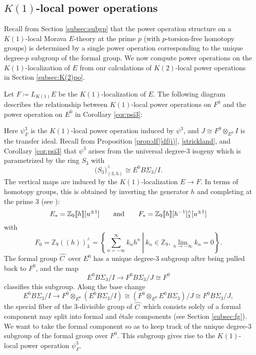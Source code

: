 \documentclass{gtpart}
\theoremstyle{definition}
\theoremstyle{remark}
\newcommand{\mb}[1]{\mathbb{#1}}
\newcommand{\BZ}{{\mb Z}}
\newcommand{\HC}{\widehat{C~}\!}
\newcommand{\ad}{{\rm and}}
\newcommand{\p}{\psi^3}
\newcommand{\ce}{\coloneqq}
\numberwithin{equation}{section}
\numberwithin{thm}{section}
\begin{document}
\subsection{$K(1)$-local power operations}
\label{subsec:K(1)po}

Recall from Section \ref{subsec:subgp} that the power operation 
structure on a $K(1)$-local Morava $E$-theory at the prime $p$ (with 
$p$-torsion-free homotopy groups) is determined by a single power 
operation corresponding to the unique degree-$p$ subgroup of the formal 
group.  We now compute power operations on the $K(1)$-localization of 
$E$ from our calculations of $K(2)$-local power operations in Section 
\ref{subsec:K(2)po}.  

Let $F \ce L_{K(1)} E$ be the $K(1)$-localization of $E$.  The following 
diagram describes the relationship between $K(1)$-local power operations 
on $F^0$ and the power operation on $E^0$ in Corollary \ref{cor:psi3}: 
\begin{center}
\end{center}
Here $\psi_F^3$ is the $K(1)$-local power operation induced by $\p$, and 
$J \cong F^0 \otimes_{E^0} I$ is the transfer ideal.  Recall from 
Proposition \ref{prop:df}\thinspace \eqref{df(i)}, \eqref{strickland}, 
and Corollary \ref{cor:psi3} that $\p$ arises from the universal 
degree-3 isogeny which is parametrized by the ring $S_3$ with 
\[
 \big( S_3 \big)_{(3,h)}^\wedge \cong E^0 B\Sigma_3 / I.  
\]
The vertical maps are induced by the $K(1)$-localization $E \to F$.  In 
terms of homotopy groups, this is obtained by inverting the generator 
$h$ and completing at the prime 3 (see \cite[Corollary 1.5.5]{hovey97}): 
\[
 E_* = \BZ_9 \llbracket h \rrbracket [u^{\pm1}] \qquad \ad \qquad 
 F_* = \BZ_9 \llbracket h \rrbracket [h^{-1}]_3^\wedge [u^{\pm1}] 
\]
with 
\[
 F_0 = \BZ_9 (\!(h)\!)_3^\wedge = 
 \left.\left\{\sum_{n = -\infty}^{\infty} k_n h^n~\right|~k_n \in \BZ_9, 
 \lim_{n \to -\infty} k_n = 0\right\}.  
\]
The formal group $\HC$ over $E^0$ has a unique degree-3 subgroup after 
being pulled back to $F^0$, and the map 
\[
 E^0 B\Sigma_3 / I \to F^0 B\Sigma_3 / J \cong F^0 
\]
classifies this subgroup.  Along the base change 
\[
 E^0 B\Sigma_3 / I \to F^0 \otimes_{E^0} (E^0 B\Sigma_3 / I) 
 \cong (F^0 \otimes_{E^0} E^0 B\Sigma_3) / J \cong F^0 B\Sigma_3 / J, 
\]
the special fiber of the 3-divisible group of $\HC$ which consists 
solely of a formal component may split into formal and \'etale 
components (see Section \ref{subsec:fg}).  We want to take the formal 
component so as to keep track of the unique degree-3 subgroup of the 
formal group over $F^0$.  This subgroup gives rise to the $K(1)$-local 
power operation $\psi_F^3$.  
\end{document}
